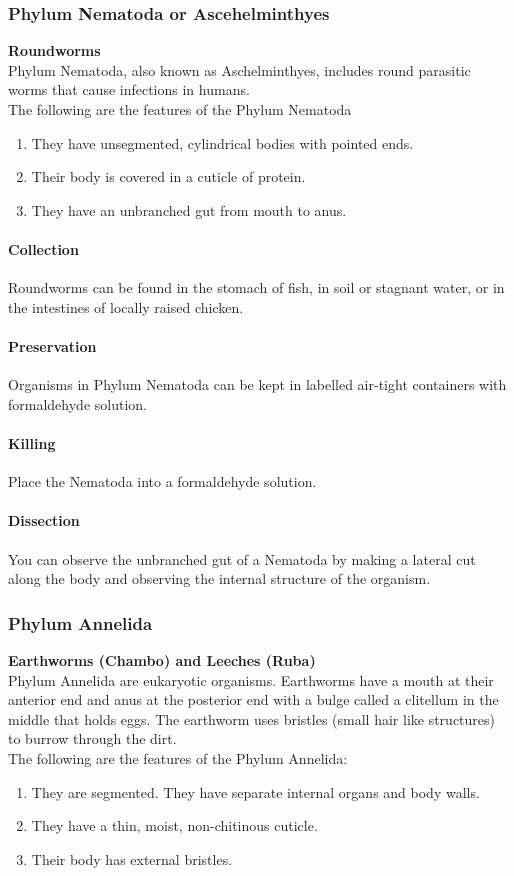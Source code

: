 \begin{multicols}{2}
\subsubsection{Phylum Nematoda or Ascehelminthyes}
\textbf{Roundworms}\\
Phylum Nematoda, also known as Aschelminthyes, includes round parasitic worms that cause infections in humans.\\
The following are the features of the Phylum Nematoda 
\begin{enumerate}
\item{They have unsegmented, cylindrical bodies with pointed ends.}
\item{Their body is covered in a cuticle of protein.}
\item{They have an unbranched gut from mouth to anus.}
\end{enumerate}

\paragraph{Collection}
Roundworms can be found in the stomach of fish, in soil or stagnant water, or in the intestines of locally raised chicken.

\paragraph{Preservation} 
Organisms in Phylum Nematoda can be kept in labelled air-tight containers with formaldehyde solution.

\paragraph{Killing}
Place the Nematoda into a formaldehyde solution.

\paragraph{Dissection}
You can observe the unbranched gut of a Nematoda by making a lateral cut along the body and observing the internal structure of the organism.

\subsubsection{Phylum Annelida}
\textbf{Earthworms (Chambo) and Leeches (Ruba)}\\ 
Phylum Annelida are eukaryotic organisms. Earthworms have a mouth at their anterior end and anus at the posterior end with a bulge called a clitellum in the middle that holds eggs. The earthworm uses bristles (small hair like structures) to burrow through the dirt. \\
The following are the features of the Phylum Annelida:
\begin{enumerate}
\item{They are segmented. They have separate internal organs and body walls.}
\item{They have a thin, moist, non-chitinous cuticle.}
\item{Their body has external bristles.}
\end{enumerate}


\end{multicols}
